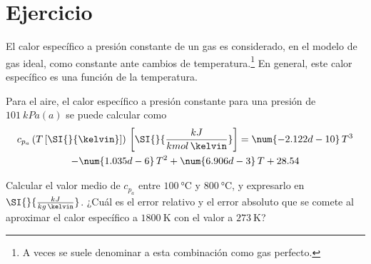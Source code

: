 \section{Ejercicio}\label{ej:Chap03Ejercicio06}
El calor específico a presión constante de un gas es considerado, en el modelo de gas ideal, como constante ante cambios de temperatura.\footnote{A veces se suele denominar a esta combinación como gas perfecto.} En general, este calor específico es una función de la temperatura.

Para el aire, el calor específico a presión constante para una presión de $\SI{101}{kPa(a)}$ se puede calcular como
\begin{multline}
    c_{p_a}\left(T\left[\SI{}{\kelvin}\right]\right)\,\left[\SI{}{\frac{kJ}{kmol\,\kelvin}}\right]=\num{-2.122d-10}\,T^3 \\-\num{1.035d-6}\,T^2
    +\num{6.906d-3}\,T + 28.54
\end{multline}

Calcular el valor medio de $c_{p_a}$ entre $\SI{100}{\celsius}$ y $\SI{800}{\celsius}$, y expresarlo en $\SI{}{\frac{kJ}{kg\,\kelvin}}$. ¿Cuál es el error relativo y el error absoluto que se comete al aproximar el calor específico a $\SI{1800}{\kelvin}$ con el valor a $\SI{273}{\kelvin}$?
